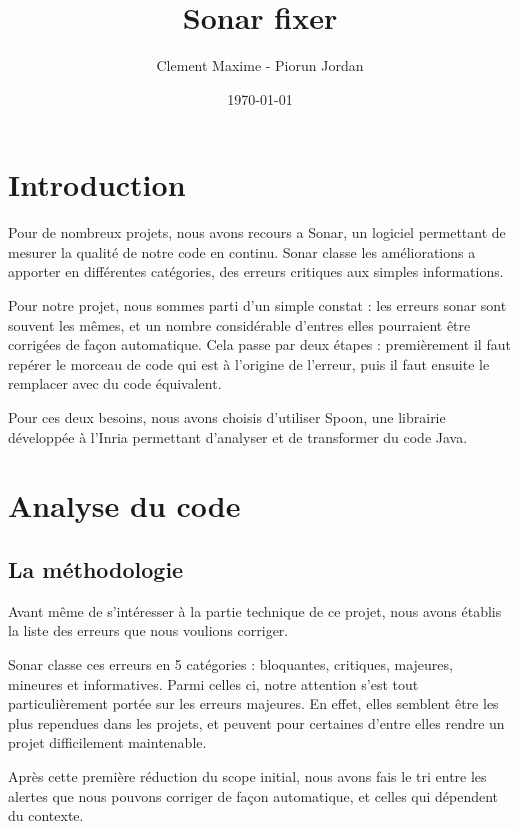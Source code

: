 \documentclass[a4paper]{article}
\begin{document}
\clearpage
\vspace*{\fill}
\begin{center}
\begin{minipage}{.6\textwidth}
\title{Sonar fixer}
\author{Clement Maxime - Piorun Jordan}
\date{\today}
\maketitle
\end{minipage}

\end{center}
\vfill %
\clearpage

\newpage
\tableofcontents
\newpage

\section{Introduction}
\par Pour de nombreux projets, nous avons recours a Sonar, un logiciel permettant de mesurer la qualité de notre code en continu. Sonar classe les améliorations a apporter en différentes catégories, des erreurs critiques aux simples informations.
\\
\par Pour notre projet, nous sommes parti d'un simple constat : les erreurs sonar sont souvent les mêmes, et un nombre considérable d'entres elles pourraient être corrigées de façon automatique. Cela passe par deux étapes : premièrement il faut repérer le morceau de code qui est à l'origine de l'erreur, puis il faut ensuite le remplacer avec du code équivalent.
\\
\par Pour ces deux besoins, nous avons choisis d'utiliser Spoon, une librairie développée à l'Inria permettant d'analyser et de transformer du code Java.

\newpage
\section{Analyse du code}
\subsection{La méthodologie}
\par Avant même de s'intéresser à la partie technique de ce projet, nous avons établis la liste des erreurs que nous voulions corriger.
\\
\par Sonar classe ces erreurs en 5 catégories : bloquantes, critiques, majeures, mineures et informatives. Parmi celles ci, notre attention s'est tout particulièrement portée sur les erreurs majeures. En effet, elles semblent être les plus rependues dans les projets, et peuvent pour certaines d'entre elles rendre un projet difficilement maintenable.
\\
\par Après cette première réduction du scope initial, nous avons fais le tri entre les alertes que nous pouvons corriger de façon automatique, et celles qui dépendent du contexte. 
\end{document}
